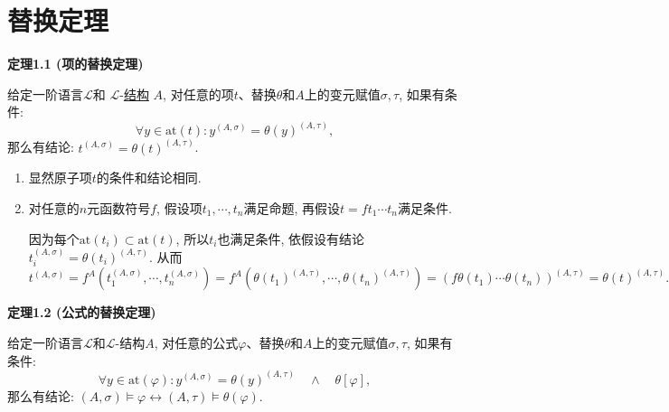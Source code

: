 


\setlength{\abovedisplayskip}{1pt}
\setlength{\belowdisplayskip}{1pt}

\section{替换定理}

\hypertarget{sec:定理1.1}{}
\noindent\textbf{定理1.1 (项的替换定理)}

给定一阶语言$\mathcal{L}$和
$\mathcal{L}$-\href{../01 一阶语言的结构/01 一阶语言的结构#nameddest=sec:定义1.1}
{结构} $A$, 对任意的项$t$、替换$\theta$和$A$上的变元赋值$\sigma,\tau$, 如果有条件:
\[
    \forall y\in\mathrm{at}(t):y^{(A,\sigma)}=\theta(y)^{(A,\tau)},
\]
那么有结论: $t^{(A,\sigma)}=\theta(t)^{(A,\tau)}$.


\begin{enumerate}
    \item 显然原子项$t$的条件和结论相同.
    \item 对任意的$n$元函数符号$f$, 假设项$t_1,\cdots,t_n$满足命题,
    再假设$t=ft_1\cdots t_n$满足条件.
    
    \hspace{2.17em}
    因为每个$\mathrm{at}(t_i)\subset\mathrm{at}(t)$,
    所以$t_i$也满足条件, 依假设有结论$t_i^{(A,\sigma)}=\theta(t_i)^{(A,\tau)}$. 从而
    \begin{equation*}
        t^{(A,\sigma)}=f^A(t_1^{(A,\sigma)},\cdots,t_n^{(A,\sigma)})=
        f^A(\theta(t_1)^{(A,\tau)},\cdots,\theta(t_n)^{(A,\tau)})
        =(f\theta(t_1)\cdots\theta(t_n))^{(A,\tau)}=\theta(t)^{(A,\tau)}.
    \tag*{\qedsymbol}\end{equation*}
\end{enumerate}

\vspace{10pt}

\hypertarget{sec:定理1.2}{}
\noindent\textbf{定理1.2 (公式的替换定理)}

给定一阶语言$\mathcal{L}$和$\mathcal{L}$-结构$A$,
对任意的公式$\varphi$、替换$\theta$和$A$上的变元赋值$\sigma,\tau$, 如果有条件:
\[
    \forall y\in\mathrm{at}(\varphi):
    y^{(A,\sigma)}=\theta(y)^{(A,\tau)}\quad\land\quad\theta[\varphi],
\]
那么有结论: $(A,\sigma)\models\varphi\leftrightarrow
(A,\tau)\models\theta(\varphi)$.



